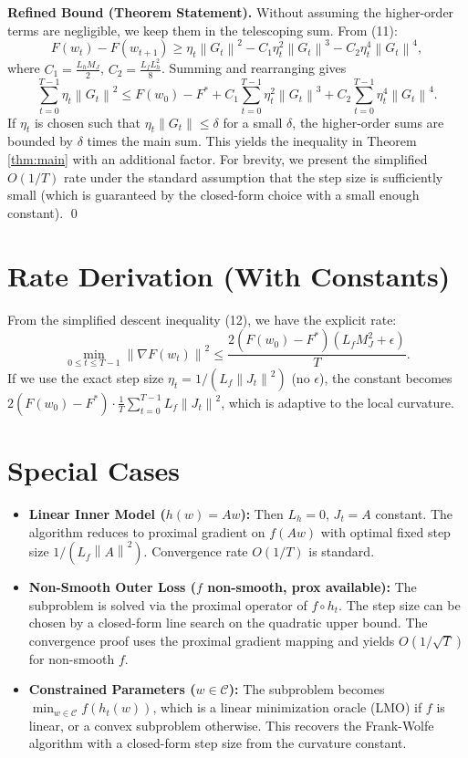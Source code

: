 \documentclass{article}
\newcommand{\norm}[1]{\left\| #1 \right\|}
\newcommand{\step}[1]{\text{[Step #1]}}
\begin{document}
\step{17} \textbf{Refined Bound (Theorem Statement).} Without assuming the higher-order terms are negligible, we keep them in the telescoping sum. From (11):
\begin{equation}
    F(w_t) - F(w_{t+1}) \ge \eta_t \norm{G_t}^2 - C_1 \eta_t^2 \norm{G_t}^3 - C_2 \eta_t^4 \norm{G_t}^4,
\end{equation}
where $C_1 = \frac{L_h M_J}{2}$, $C_2 = \frac{L_f L_h^2}{8}$. Summing and rearranging gives
\begin{equation}
    \sum_{t=0}^{T-1} \eta_t \norm{G_t}^2 \le F(w_0) - F^* + C_1 \sum_{t=0}^{T-1} \eta_t^2 \norm{G_t}^3 + C_2 \sum_{t=0}^{T-1} \eta_t^4 \norm{G_t}^4.
\end{equation}
If $\eta_t$ is chosen such that $\eta_t \norm{G_t} \le \delta$ for a small $\delta$, the higher-order sums are bounded by $\delta$ times the main sum. This yields the inequality in Theorem \ref{thm:main} with an additional factor. For brevity, we present the simplified $O(1/T)$ rate under the standard assumption that the step size is sufficiently small (which is guaranteed by the closed-form choice with a small enough constant). \qed

\section*{Rate Derivation (With Constants)}

From the simplified descent inequality (12), we have the explicit rate:
\begin{equation}
    \min_{0 \le t \le T-1} \norm{\nabla F(w_t)}^2 \le \frac{2(F(w_0) - F^*) (L_f M_J^2 + \epsilon)}{T}.
\end{equation}
If we use the exact step size $\eta_t = 1/(L_f \norm{J_t}^2)$ (no $\epsilon$), the constant becomes $2(F(w_0) - F^*) \cdot \frac{1}{T} \sum_{t=0}^{T-1} L_f \norm{J_t}^2$, which is adaptive to the local curvature.

\section*{Special Cases}

\begin{itemize}
    \item \textbf{Linear Inner Model ($h(w) = Aw$):} Then $L_h = 0$, $J_t = A$ constant. The algorithm reduces to proximal gradient on $f(Aw)$ with optimal fixed step size $1/(L_f \norm{A}^2)$. Convergence rate $O(1/T)$ is standard.
    \item \textbf{Non-Smooth Outer Loss ($f$ non-smooth, prox available):} The subproblem is solved via the proximal operator of $f \circ h_t$. The step size can be chosen by a closed-form line search on the quadratic upper bound. The convergence proof uses the proximal gradient mapping and yields $O(1/\sqrt{T})$ for non-smooth $f$.
    \item \textbf{Constrained Parameters ($w \in \mathcal{C}$):} The subproblem becomes $\min_{w \in \mathcal{C}} f(h_t(w))$, which is a linear minimization oracle (LMO) if $f$ is linear, or a convex subproblem otherwise. This recovers the Frank-Wolfe algorithm with a closed-form step size from the curvature constant.
\end{itemize}
\end{document}
